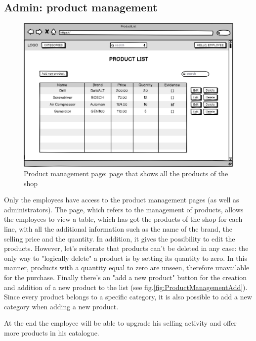 \subsection{Admin: product management} 
    \begin{figure}[H]
        \centering
        \includegraphics[width=\textwidth,height=0.7\textheight,keepaspectratio]{mockups/productListPageMockup.png}
            \caption{Product management page: page that shows all the products of the shop}
            \label{fig:ProductManagement}
    \end{figure}
Only the employees have access to the product management pages (as well as administrators). 
The page, which refers to the management of products, allows the employees to view a table, which has got the products of the shop for each line, with all the additional information such as the name of the brand, the selling price and the quantity. 
In addition, it gives the possibility to edit the products. However, let's reiterate that products can't be deleted in any case: the only way to "logically delete" a product is by setting its quantity to zero. In this manner, products with a quantity equal to zero are unseen, therefore unavailable for the purchase. 
Finally there's an "add a new product" button for the creation and addition of a new product to the list (see fig.\ref{fig:ProductManagementAdd}). Since every product belongs to a specific category, it is also possible to add a new category when adding a new product.

At the end the employee will be able to upgrade his selling activity and offer more products in his catalogue. 
    
